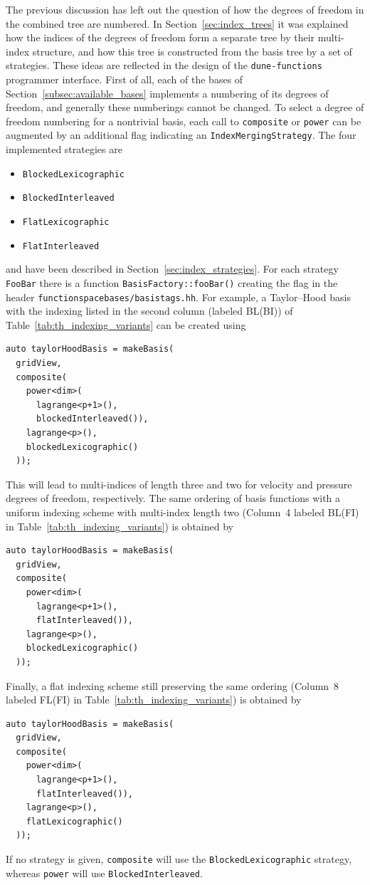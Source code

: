 \documentclass[a4paper,10pt,headings=normal,bibliography=totoc]{scrartcl}
\newcommand{\cpp}[1]{\lstinline[basicstyle=\ttfamily]!#1!}
\newcommand{\dunemodule}[1]{\texttt{#1}}
\newcommand{\file}[1]{\texttt{#1}}
\begin{document}
The previous discussion has left out the question of how the degrees of freedom in the combined tree
are numbered.  In Section~\ref{sec:index_trees} it was explained how the indices
of the degrees of freedom form a separate tree by their multi-index structure, and how this tree
is constructed from the basis tree by a set of strategies.
These ideas are reflected in the design of the \dunemodule{dune-functions} programmer interface.
First of all, each of the bases of
Section~\ref{subsec:available_bases} implements a numbering of its degrees of freedom,
and generally these numberings cannot be changed.
To select a degree of freedom numbering for a nontrivial basis,
each call to \cpp{composite} or \cpp{power} can be augmented by an additional
flag indicating an \cpp{IndexMergingStrategy}. The four implemented strategies are
\begin{itemize}
  \item
    \cpp{BlockedLexicographic}
  \item
    \cpp{BlockedInterleaved}
  \item
    \cpp{FlatLexicographic}
  \item
    \cpp{FlatInterleaved}
\end{itemize}
and have been described in Section~\ref{sec:index_strategies}.
For each strategy \cpp{FooBar} there is a function \cpp{BasisFactory::fooBar()} creating
the flag in the header \file{functionspacebases/basistags.hh}.
For example, a Taylor--Hood basis with the indexing listed in the
second column (labeled BL(BI)) of Table~\ref{tab:th_indexing_variants} can be created using
\begin{lstlisting}[style=Example]
auto taylorHoodBasis = makeBasis(
  gridView,
  composite(
    power<dim>(
      lagrange<p+1>(),
      blockedInterleaved()),
    lagrange<p>(),
    blockedLexicographic()
  ));
\end{lstlisting}
This will lead to multi-indices of length three and two
for velocity and pressure degrees of freedom, respectively.
The same ordering of basis functions with a uniform indexing scheme
with multi-index length two (Column~4 labeled BL(FI) in Table~\ref{tab:th_indexing_variants}) is obtained by
\begin{lstlisting}[style=Example]
auto taylorHoodBasis = makeBasis(
  gridView,
  composite(
    power<dim>(
      lagrange<p+1>(),
      flatInterleaved()),
    lagrange<p>(),
    blockedLexicographic()
  ));
\end{lstlisting}
Finally, a flat indexing scheme still preserving the same ordering
(Column~8 labeled FL(FI) in Table~\ref{tab:th_indexing_variants})
is obtained by
\begin{lstlisting}[style=Example]
auto taylorHoodBasis = makeBasis(
  gridView,
  composite(
    power<dim>(
      lagrange<p+1>(),
      flatInterleaved()),
    lagrange<p>(),
    flatLexicographic()
  ));
\end{lstlisting}
If no strategy is given, \cpp{composite} will use the \cpp{BlockedLexicographic} strategy,
whereas \cpp{power} will use \cpp{BlockedInterleaved}.
\end{document}
